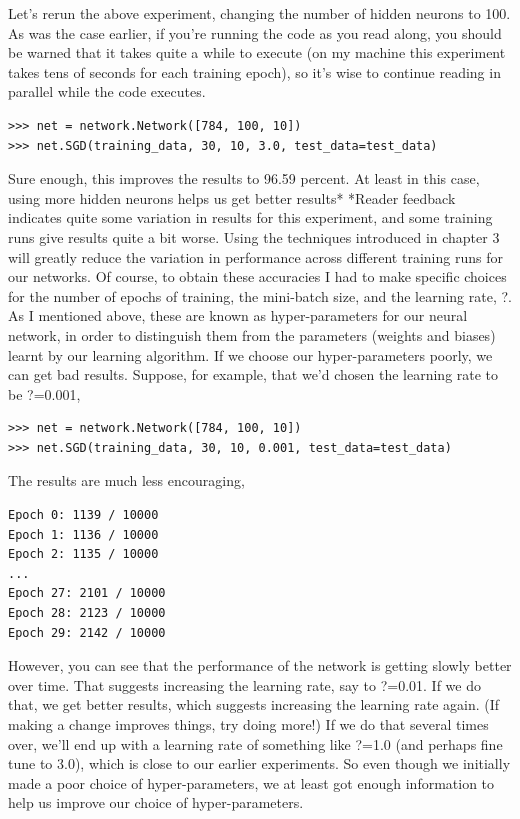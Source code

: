 Let's rerun the above experiment, changing the number of hidden neurons to 100. As was the case earlier, if you're running the code as you read along, you should be warned that it takes quite a while to execute (on my machine this experiment takes tens of seconds for each training epoch), so it's wise to continue reading in parallel while the code executes.
\begin{lstlisting}
>>> net = network.Network([784, 100, 10])
>>> net.SGD(training_data, 30, 10, 3.0, test_data=test_data)
\end{lstlisting}
Sure enough, this improves the results to 96.59 percent. At least in this case, using more hidden neurons helps us get better results* 
*Reader feedback indicates quite some variation in results for this experiment, and some training runs give results quite a bit worse. Using the techniques introduced in chapter 3 will greatly reduce the variation in performance across different training runs for our networks.
Of course, to obtain these accuracies I had to make specific choices for the number of epochs of training, the mini-batch size, and the learning rate, ?. As I mentioned above, these are known as hyper-parameters for our neural network, in order to distinguish them from the parameters (weights and biases) learnt by our learning algorithm. If we choose our hyper-parameters poorly, we can get bad results. Suppose, for example, that we'd chosen the learning rate to be ?=0.001,
\begin{lstlisting}
>>> net = network.Network([784, 100, 10])
>>> net.SGD(training_data, 30, 10, 0.001, test_data=test_data)
\end{lstlisting}
The results are much less encouraging,
\begin{lstlisting}
Epoch 0: 1139 / 10000
Epoch 1: 1136 / 10000
Epoch 2: 1135 / 10000
...
Epoch 27: 2101 / 10000
Epoch 28: 2123 / 10000
Epoch 29: 2142 / 10000
\end{lstlisting}
However, you can see that the performance of the network is getting slowly better over time. That suggests increasing the learning rate, say to ?=0.01. If we do that, we get better results, which suggests increasing the learning rate again. (If making a change improves things, try doing more!) If we do that several times over, we'll end up with a learning rate of something like ?=1.0 (and perhaps fine tune to 3.0), which is close to our earlier experiments. So even though we initially made a poor choice of hyper-parameters, we at least got enough information to help us improve our choice of hyper-parameters.
